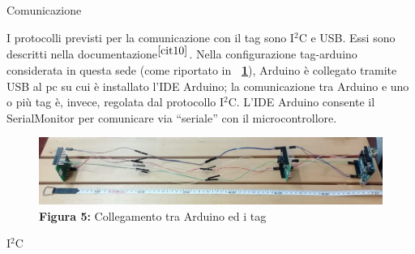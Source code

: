 \documentclass[12pt]{report}
\begin{document}
	\begin{section}{Comunicazione}

		I protocolli previsti per la comunicazione con il tag sono I$^2$C e USB. Essi sono descritti nella documentazione$^{{\cite{cit10}}}$. Nella configurazione tag-arduino considerata in questa sede (come riportato in \textbf{\figurename~\ref{Fardu_tag}}), Arduino è collegato tramite USB al pc su cui è installato l’IDE 		Arduino; la comunicazione tra Arduino e uno o più tag è, invece, regolata dal protocollo I$^2$C. L'IDE Arduino consente il SerialMonitor per comunicare via “seriale” con il microcontrollore.

		\begin{figure}[h]
			\centering
			\includegraphics[scale=0.38]{ardu_tag}
	 		\caption{\textbf{Figura 5:} Collegamento tra Arduino ed i tag}\label{Fardu_tag}
		\end{figure}

		\begin{subsection}{I$^{2}$C}


\end{subsection}
\end{section}
\end{document}

